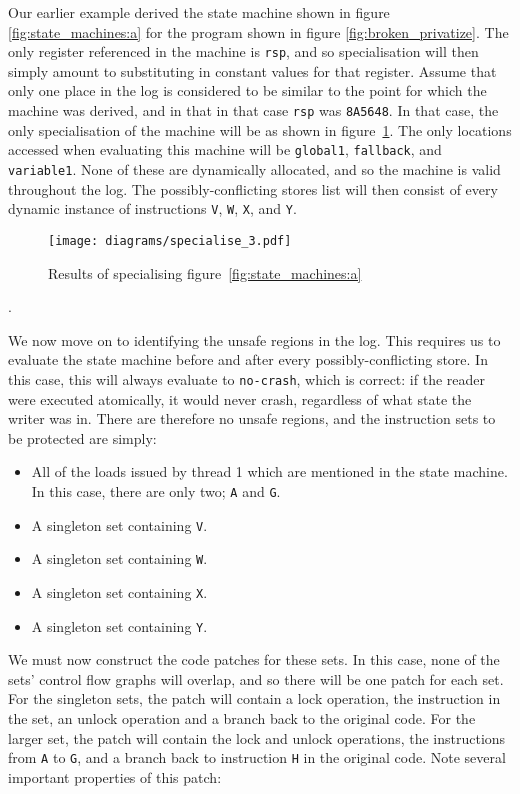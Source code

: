 \documentclass[10pt,twocolumn,preprint,natbib,authoryear]{sigplanconf}
\begin{document}
Our earlier example derived the state machine shown in figure
\ref{fig:state_machines:a} for the program shown in figure
\ref{fig:broken_privatize}.  The only register referenced in the
machine is \verb|rsp|, and so specialisation will then simply amount
to substituting in constant values for that register.  Assume that
only one place in the log is considered to be similar to the point for
which the machine was derived, and in that in that case \verb|rsp| was
\verb|8A5648|.  In that case, the only specialisation of the machine
will be as shown in figure~\ref{fig:specialised_example_machine}.  The
only locations accessed when evaluating this machine will be
\verb|global1|, \verb|fallback|, and \verb|variable1|.  None of these
are dynamically allocated, and so the machine is valid throughout the
log.  The possibly-conflicting stores list will then consist of every
dynamic instance of instructions \verb|V|, \verb|W|, \verb|X|, and
\verb|Y|.

\begin{figure}[thb]
\texttt{[image: diagrams/specialise\_3.pdf]}
\caption{Results of specialising figure~\ref{fig:state_machines:a}}
\label{fig:specialised_example_machine}
\end{figure}.

We now move on to identifying the unsafe regions in the log.  This
requires us to evaluate the state machine before and after every
possibly-conflicting store.  In this case, this will always evaluate
to \verb|no-crash|, which is correct: if the reader were executed
atomically, it would never crash, regardless of what state the writer
was in.  There are therefore no unsafe regions, and the instruction
sets to be protected are simply:

\begin{itemize}
\item All of the loads issued by thread 1 which are mentioned in the
  state machine.  In this case, there are only two; \verb|A| and
  \verb|G|.
\item A singleton set containing \verb|V|.
\item A singleton set containing \verb|W|.
\item A singleton set containing \verb|X|.
\item A singleton set containing \verb|Y|.
\end{itemize}

We must now construct the code patches for these sets.  In this case,
none of the sets' control flow graphs will overlap, and so there will
be one patch for each set.  For the singleton sets, the patch will
contain a lock operation, the instruction in the set, an unlock
operation and a branch back to the original code.  For the larger set,
the patch will contain the lock and unlock operations, the
instructions from \verb|A| to \verb|G|, and a branch back to
instruction \verb|H| in the original code.  Note several important
properties of this patch:
\end{document}
